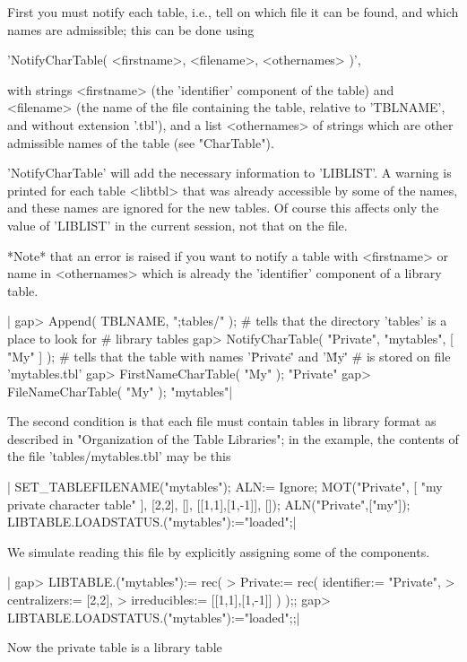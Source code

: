 First you must notify each table, i.e., tell  {\GAP} on which file it can
be found, and which names are admissible; this can be done using

'NotifyCharTable( <firstname>, <filename>, <othernames> )',

with strings <firstname> (the  'identifier'  component of the table)  and
<filename> (the name  of  the  file  containing the  table,  relative  to
'TBLNAME', and without extension  '.tbl'),   and a list <othernames>   of
strings which are other admissible names of the table (see "CharTable").

'NotifyCharTable' will add the necessary information to 'LIBLIST'.
A warning is printed for each table <libtbl> that was already accessible
by some of the names, and these names are ignored for the new tables.
Of course this affects only the value of 'LIBLIST' in the current {\GAP}
session, not that on the file.

*Note* that an error   is  raised if you   want  to notify a  table  with
<firstname> or  name  in <othernames> which  is already  the 'identifier'
component of a library table.

|    gap> Append( TBLNAME, ";tables/" );
    # tells {\GAP} that the directory 'tables' is a place to look for
    # library tables
    gap> NotifyCharTable( "Private", "mytables", [ "My" ] );
    # tells {\GAP} that the table with names '\"Private\"' and '\"My\"'
    # is stored on file 'mytables.tbl'
    gap> FirstNameCharTable( "My" );
    "Private"
    gap> FileNameCharTable( "My" );
    "mytables"|

The  second  condition is that each  file  must contain tables in library
format  as  described in  "Organization  of the Table Libraries";  in the
example, the contents of the file 'tables/mytables.tbl' may be this\:

|    SET_TABLEFILENAME("mytables");
    ALN:= Ignore;
    MOT("Private",
    [
    "my private character table"
    ],
    [2,2],
    [],
    [[1,1],[1,-1]],
    []);
    ALN("Private",["my"]);
    LIBTABLE.LOADSTATUS.("mytables"):="loaded";|

We simulate reading this file by explicitly assigning some of the
components.

|    gap> LIBTABLE.("mytables"):= rec(
    > Private:= rec( identifier:= "Private",
    >                centralizers:= [2,2],
    >                irreducibles:= [[1,1],[1,-1]] ) );;
    gap> LIBTABLE.LOADSTATUS.("mytables"):="loaded";;|

Now the private table is a library table\:

